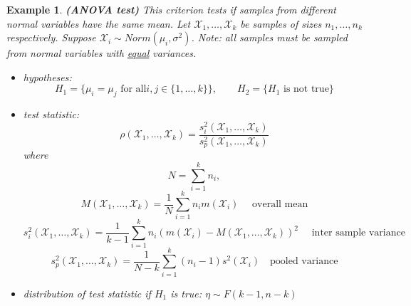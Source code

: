 \documentclass[12pt]{article}
\newtheorem{example}[theorem]{Example}
\begin{document}
\begin{example} \textbf{(ANOVA test)} This criterion tests if samples from
    different normal variables have the same mean. Let
    $\mathscr{X}_1,\ldots,\mathscr{X}_k$ be samples of sizes $n_1,\ldots,n_k$
    respectively. Suppose $\mathscr{X}_i\sim Norm(\mu_i,\sigma^2)$. Note: all
    samples must be sampled from normal variables with \underline{equal}
    variances.
    \begin{itemize}
        \item hypotheses:
              $$
                  H_1=\{\mu_i=\mu_j
                  \mbox{ for all}i,j\in \{1,\ldots,k\} \},
                  \quad\quad H_2=\{H_1\mbox{ is not true}\}
              $$
        \item test statistic:
              $$
                  \rho(\mathscr{X}_1,\ldots,\mathscr{X}_k)
                  =\frac{s_i^2(\mathscr{X}_1,\ldots,\mathscr{X}_k)}
                  {s_p^2(\mathscr{X}_1,\ldots,\mathscr{X}_k)}
              $$
              where
              $$
                  N=\sum_{i=1}^k n_i,
              $$
              $$
                  M(\mathscr{X}_1,\ldots,\mathscr{X}_k)
                  =\frac{1}{N}\sum_{i=1}^k n_i m(\mathscr{X}_i)
                  \quad\mbox{ overall mean}
              $$
              $$
                  s_i^2(\mathscr{X}_1,\ldots,\mathscr{X}_k)
                  =\frac{1}{k-1}\sum_{i=1}^k n_i{(m(\mathscr{X}_i)
                  -M(\mathscr{X}_1,\ldots,\mathscr{X}_k))}^2
                  \quad \mbox{ inter sample variance}
              $$
              $$
                  s_p^2(\mathscr{X}_1,\ldots,\mathscr{X}_k)
                  =\frac{1}{N-k}\sum_{i=1}^k (n_i-1) s^2(\mathscr{X}_i)
                  \quad \mbox{pooled variance}
              $$
        \item distribution of test statistic if $H_1$ is true:
              $\eta\sim F(k-1, n-k)$
    \end{itemize}
\end{example}
\end{document}
